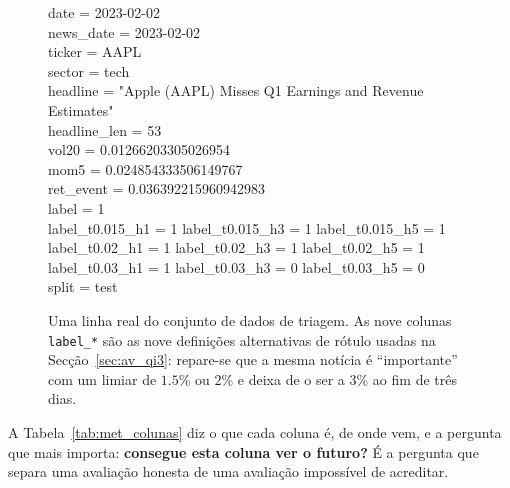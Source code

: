 \begin{figure}[ht]
\centering
\begin{tcolorbox}[colback=black!3, colframe=black!30, boxrule=0.4pt, arc=2pt,
                  width=0.96\textwidth, fontupper=\ttfamily\footnotesize]
date            = 2023-02-02\\
news\_date       = 2023-02-02\\
ticker          = AAPL\\
sector          = tech\\
headline        = "Apple (AAPL) Misses Q1 Earnings and Revenue Estimates"\\
headline\_len    = 53\\
vol20           = 0.01266203305026954\\
mom5            = 0.024854333506149767\\
ret\_event       = 0.036392215960942983\\
label           = 1\\
label\_t0.015\_h1 = 1 \quad label\_t0.015\_h3 = 1 \quad label\_t0.015\_h5 = 1\\
label\_t0.02\_h1  = 1 \quad label\_t0.02\_h3  = 1 \quad label\_t0.02\_h5  = 1\\
label\_t0.03\_h1  = 1 \quad label\_t0.03\_h3  = 0 \quad label\_t0.03\_h5  = 0\\
split           = test
\end{tcolorbox}
\caption[Uma linha do conjunto de treino, inteira]{Uma linha real do conjunto de dados de triagem.
As nove colunas \texttt{label\_*} são as nove definições alternativas de rótulo usadas na
Secção~\ref{sec:av_qi3}: repare-se que a mesma notícia é ``importante'' com um limiar de $1.5\%$
ou $2\%$ e deixa de o ser a $3\%$ ao fim de três dias.}
\label{fig:met_linha}
\end{figure}

A Tabela~\ref{tab:met_colunas} diz o que cada coluna é, de onde vem, e a pergunta que mais importa:
\textbf{consegue esta coluna ver o futuro?} É a pergunta que separa uma avaliação honesta de uma
avaliação impossível de acreditar.

